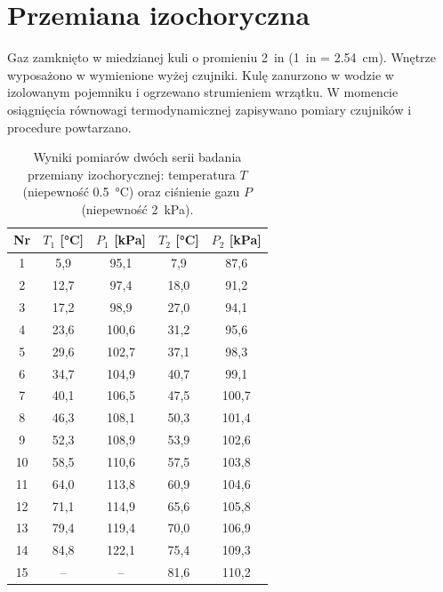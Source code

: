 \documentclass[12pt]{article}
\begin{document}
\section{Przemiana izochoryczna}
Gaz zamknięto w miedzianej kuli o promieniu \SI{2}{in} (\SI{1}{in} = \SI{2.54}{cm}). Wnętrze wyposażono w wymienione wyżej czujniki. Kulę zanurzono w wodzie w izolowanym pojemniku i ogrzewano strumieniem wrzątku. W momencie osiągnięcia równowagi termodynamicznej zapisywano pomiary czujników i procedure powtarzano.

\begin{table}[H]
  \centering
  \begin{tabular}{c|cc|cc}
    \toprule
    \textbf{Nr} & $T_1$ [\si{\celsius}] & $P_1$ [\si{\kilo\pascal}] & $T_2$ [\si{\celsius}] & $P_2$ [\si{\kilo\pascal}] \\
    \midrule
    1  &  5,9 &  95,1 &  7,9 &  87,6 \\
    2  & 12,7 &  97,4 & 18,0 &  91,2 \\
    3  & 17,2 &  98,9 & 27,0 &  94,1 \\
    4  & 23,6 & 100,6 & 31,2 &  95,6 \\
    5  & 29,6 & 102,7 & 37,1 &  98,3 \\
    6  & 34,7 & 104,9 & 40,7 &  99,1 \\
    7  & 40,1 & 106,5 & 47,5 & 100,7 \\
    8  & 46,3 & 108,1 & 50,3 & 101,4 \\
    9  & 52,3 & 108,9 & 53,9 & 102,6 \\
    10 & 58,5 & 110,6 & 57,5 & 103,8 \\
    11 & 64,0 & 113,8 & 60,9 & 104,6 \\
    12 & 71,1 & 114,9 & 65,6 & 105,8 \\
    13 & 79,4 & 119,4 & 70,0 & 106,9 \\
    14 & 84,8 & 122,1 & 75,4 & 109,3 \\
    15 &  --  &   --  & 81,6 & 110,2 \\
    \bottomrule
  \end{tabular}
  \caption{Wyniki pomiarów dwóch serii badania przemiany izochorycznej: temperatura \(T\) (niepewność \SI{0.5}{\celsius}) oraz ciśnienie gazu \(P\) (niepewność \SI{2}{\kilo\pascal}).}
  \label{tab:isochoric_measurements}
\end{table}
\end{document}
